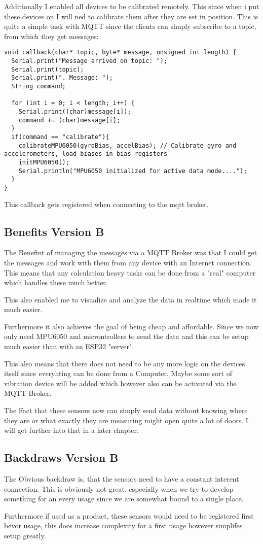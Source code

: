 Additionally I enabled all devices to be calibrated remotely. This since when i put these devices on I will ned to calibrate them after they are set in position. This is quite a simple task with MQTT since the clients can simply subscribe to a topic, from which they get messages: 

\begin{lstlisting}
void callback(char* topic, byte* message, unsigned int length) {
  Serial.print("Message arrived on topic: ");
  Serial.print(topic);
  Serial.print(". Message: ");
  String command;
  
  for (int i = 0; i < length; i++) {
    Serial.print((char)message[i]);
    command += (char)message[i];
  }
  if(command == "calibrate"){
    calibrateMPU6050(gyroBias, accelBias); // Calibrate gyro and accelerometers, load biases in bias registers  
    initMPU6050(); 
    Serial.println("MPU6050 initialized for active data mode....");
  }
}
\end{lstlisting}
This callback gets registered when connecting to the mqtt broker.

\subsection{Benefits Version B}

The Benefint of managing the messages via a MQTT Broker was that I could get the messages and work with them from any device with an Internet connection. This means that any calculation heavy tasks can be done from a "real" computer which handles these much better. 

This also enabled me to visualize and analyze the data in realtime which made it much easier. 

Furthermore it also achieves the goal of being cheap and affordable. Since we now only need MPU6050 and microntrollers to send the data and this can be setup much easier than with an ESP32 "server".

This also means that there does not need to be any more logic on the devices itself since everyhting can be done from a Computer. Maybe some sort of vibration device will be added which however also can be activated via the MQTT Broker. 

The Fact that these sensors now can simply send data without knowing where they are or what exactly they are measuring might open quite a lot of doors. I will get further into that in a later chapter.

\subsection{Backdraws Version B}

The Obvious backdraw is, that the sensors need to have a constant interent connection. This is obviously not great, especially when we try to develop something for an every usage since we are somewhat bound to a single place. 

Furthermore if used as a product, these sensors would need to be registered first bevor usage, this does increase complexity for a first usage however simplifes setup greatly.




